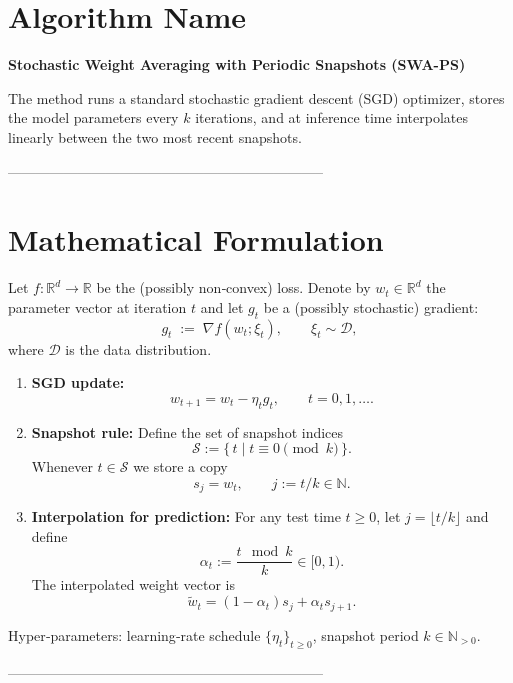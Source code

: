 \documentclass{article}
\newcommand{\R}{\mathbb{R}}
\begin{document}
\section*{Algorithm Name}
\textbf{Stochastic Weight Averaging with Periodic Snapshots (SWA-PS)}  

The method runs a standard stochastic gradient descent (SGD) optimizer, stores the model parameters every $k$ iterations, and at inference time interpolates linearly between the two most recent snapshots.

--------------------------------------------------------------------

\section*{Mathematical Formulation}
Let $f:\R^{d}\to\R$ be the (possibly non‑convex) loss.  
Denote by $w_t\in\R^{d}$ the parameter vector at iteration $t$ and let $g_t$ be a (possibly stochastic) gradient:
\[
g_t \;:=\; \nabla f(w_t;\xi_t),\qquad \xi_t\sim\mathcal{D},
\]
where $\mathcal{D}$ is the data distribution.  

\begin{enumerate}[label=\textbf{Step \arabic*.}, leftmargin=2.5cm]
\item \textbf{SGD update:}
\[
w_{t+1}=w_t-\eta_t g_t ,\qquad t=0,1,\dots .
\tag{1}
\]

\item \textbf{Snapshot rule:}  
Define the set of snapshot indices
\[
\mathcal{S}:=\{\,t\mid t\equiv 0\pmod{k}\,\}.
\]
Whenever $t\in\mathcal{S}$ we store a copy
\[
s_{j}=w_t,\qquad j:=t/k\in\mathbb{N}.
\tag{2}
\]

\item \textbf{Interpolation for prediction:}  
For any test time $t\ge 0$, let $j=\lfloor t/k\rfloor$ and define 
\[
\alpha_t:=\frac{t\!\!\mod k}{k}\in[0,1).
\]
The interpolated weight vector is
\[
\tilde w_t=(1-\alpha_t)s_{j}+ \alpha_t s_{j+1}.
\tag{3}
\]
\end{enumerate}

Hyper‑parameters: learning‑rate schedule $\{\eta_t\}_{t\ge0}$, snapshot period $k\in\mathbb{N}_{>0}$.

--------------------------------------------------------------------
\end{document}
